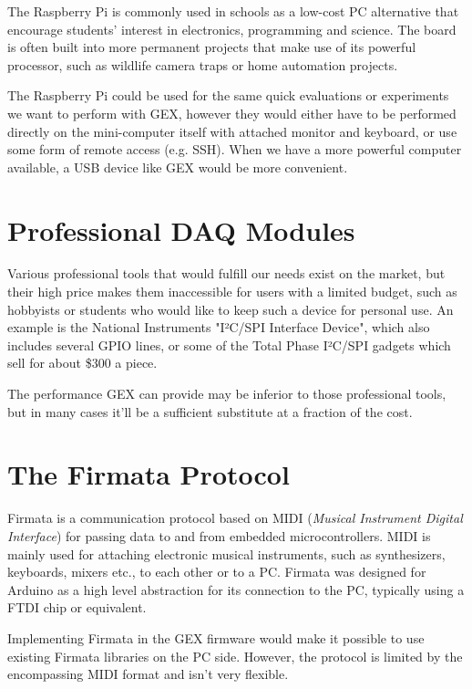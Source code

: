 The Raspberry Pi is commonly used in schools as a low-cost PC alternative that encourage students' interest in electronics, programming and science. The board is often built into more permanent projects that make use of its powerful processor, such as wildlife camera traps or home automation projects.

The Raspberry Pi could be used for the same quick evaluations or experiments we want to perform with GEX, however they would either have to be performed directly on the mini-computer itself with attached monitor and keyboard, or use some form of remote access (e.g. SSH). When we have a more powerful computer available, a USB device like GEX would be more convenient.

\section{Professional DAQ Modules}

Various professional tools that would fulfill our needs exist on the market, but their high price makes them inaccessible for users with a limited budget, such as hobbyists or students who would like to keep such a device for personal use. An example is the National Instruments "I²C/SPI Interface Device", which also includes several GPIO lines, or some of the Total Phase I²C/SPI gadgets which sell for about \$300 a piece. 

The performance GEX can provide may be inferior to those professional tools, but in many cases it'll be a sufficient substitute at a fraction of the cost.



\section{The Firmata Protocol}


Firmata is a communication protocol based on MIDI (\textit{Musical Instrument Digital Interface}) for passing data to and from embedded microcontrollers. MIDI is mainly used for attaching electronic musical instruments, such as synthesizers, keyboards, mixers etc., to each other or to a PC. Firmata was designed for Arduino as a high level abstraction for its connection to the PC, typically using a FTDI chip or equivalent.

Implementing Firmata in the GEX firmware would make it possible to use existing Firmata libraries on the PC side. However, the protocol is limited by the encompassing MIDI format and isn't very flexible. 

